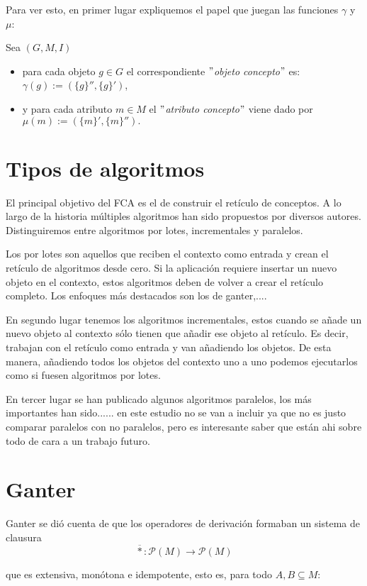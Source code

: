 \documentclass{article}
\begin{document}
Para ver esto, en primer lugar expliquemos el papel que juegan las funciones $\gamma$ y $\mu$:

Sea $(G,M,I)$
\begin{itemize} 
    \item para cada objeto $g \in G$ el correspondiente $"$\textit{objeto concepto}$"$ es: $\gamma (g) := (\{g\}'',\{g\}')$,
    \item y para cada atributo $m \in M$ el $"$\textit{atributo concepto}$"$ viene dado por $\mu(m) :=(\{m\}',\{m\}'').$
\end{itemize}

\section{Tipos de algoritmos}

El principal objetivo del FCA es el de construir el retículo de conceptos. A lo largo de la historia múltiples algoritmos han sido propuestos por diversos autores. Distinguiremos entre algoritmos por lotes, incrementales y paralelos.

Los por lotes son aquellos que reciben el contexto como entrada y crean el retículo de algoritmos desde cero. Si la aplicación requiere insertar un nuevo objeto en el contexto, estos algoritmos deben de volver a crear el retículo completo. Los enfoques más destacados son los de ganter,....

En segundo lugar tenemos los algoritmos incrementales, estos cuando se añade un nuevo objeto al contexto sólo tienen que añadir ese objeto al retículo. Es decir, trabajan con el retículo como entrada y van añadiendo los objetos. De esta manera, añadiendo todos los objetos del contexto uno a uno podemos ejecutarlos como si fuesen algoritmos por lotes.

En tercer lugar se han publicado algunos algoritmos paralelos, los más importantes han sido...... en este estudio no se van a incluir ya que no es justo comparar paralelos con no paralelos, pero es interesante saber que están ahi sobre todo de cara a un trabajo futuro. 


\section{Ganter}

Ganter se dió cuenta de que los operadores de derivación formaban un sistema de clausura
$$ \overline{*} : \mathcal{P}(M) \to \mathcal{P}(M) $$ 

que es extensiva, monótona e idempotente, esto es, para todo $A,B \subseteq M$:
\end{document}
